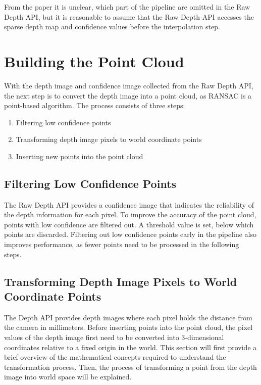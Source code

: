 From the paper it is unclear, which part of the pipeline are omitted in the Raw Depth API,
but it is reasonable to assume that the Raw Depth API accesses the sparse depth map and confidence values before the interpolation step.


\section{Building the Point Cloud}\label{sec:building-the-point-cloud}
With the depth image and confidence image collected from the Raw Depth API,
the next step is to convert the depth image into a point cloud, as RANSAC is a point-based algorithm.
The process consists of three steps:
\begin{enumerate}
    \item Filtering low confidence points
    \item Transforming depth image pixels to world coordinate points
    \item Inserting new points into the point cloud
\end{enumerate}

\subsection{Filtering Low Confidence Points}
The Raw Depth API provides a confidence image that indicates the reliability of the depth information for each pixel.
To improve the accuracy of the point cloud, points with low confidence are filtered out.
A threshold value is set, below which points are discarded.
Filtering out low confidence points early in the pipeline also improves performance,
as fewer points need to be processed in the following steps.

\subsection{Transforming Depth Image Pixels to World Coordinate Points}
The Depth API provides depth images where each pixel holds the distance from the camera in millimeters.
Before inserting points into the point cloud, the pixel values of the depth image
first need to be converted into 3-dimensional coordinates relative to a fixed origin in the world.
This section will first provide a brief overview of the mathematical concepts required to understand the transformation process.
Then, the process of transforming a point from the depth image into world space will be explained.


